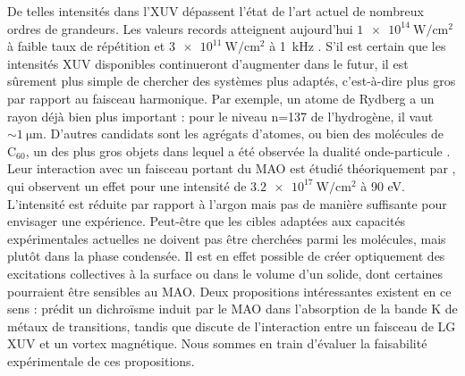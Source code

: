 De telles intensités dans l'XUV dépassent l'état de l'art actuel de nombreux ordres de grandeurs. Les valeurs records atteignent aujourd'hui $\SI{1e14}{\W\per\centi\metre\squared}$ à faible taux de répétition  et $\SI{3e11}{\W\per\centi\metre\squared}$ à 1~kHz . S'il est certain que les intensités XUV disponibles continueront d'augmenter dans le futur, il est sûrement plus simple de chercher des systèmes plus adaptés, c'est-à-dire plus gros par rapport au faisceau harmonique. Par exemple, un atome de Rydberg a un rayon déjà bien plus important : pour le niveau n=137 de l'hydrogène, il vaut $\sim\SI{1}{\micro\metre}$. D'autres candidats sont les agrégats d'atomes, ou bien des molécules de $\text{C}_{60}$, un des plus gros objets dans lequel a été observée la dualité onde-particule . Leur interaction avec un faisceau portant du MAO est étudié théoriquement par , qui observent un effet pour une intensité de $\SI{3.2e17}{\W\per\centi\metre\squared}$ à 90 eV. L'intensité est réduite par rapport à l'argon mais pas de manière suffisante pour envisager une expérience.\linebreak
Peut-être que les cibles adaptées aux capacités expérimentales actuelles ne doivent pas être cherchées parmi les molécules, mais plutôt dans la phase condensée. Il est en effet possible de créer optiquement des excitations collectives à la surface ou dans le volume d'un solide, dont certaines pourraient être sensibles au MAO. Deux propositions intéressantes existent en ce sens :  prédit un dichroïsme induit par le MAO dans l'absorption de la bande K de métaux de transitions, tandis que  discute de l'interaction entre un faisceau de LG XUV et un vortex magnétique. Nous sommes en train d'évaluer la faisabilité expérimentale de ces propositions.

